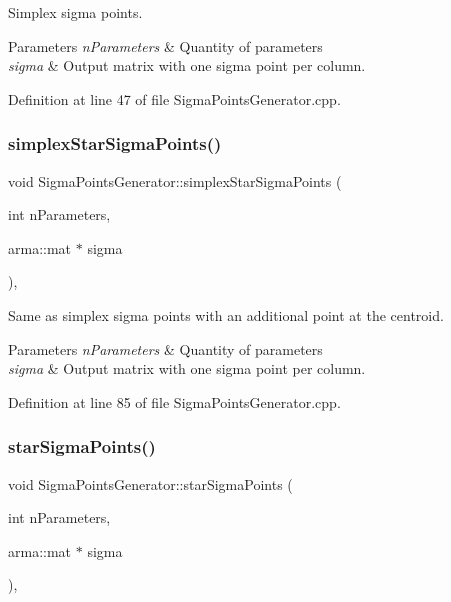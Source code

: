 Simplex sigma points. 
\begin{DoxyParams}{Parameters}
{\em n\+Parameters} & Quantity of parameters \\
\hline
{\em sigma} & Output matrix with one sigma point per column. \\
\hline
\end{DoxyParams}


Definition at line 47 of file Sigma\+Points\+Generator.\+cpp.

\mbox{\label{classSigmaPointsGenerator_aecd82749d0e9865e6abfb9b8410b9542}} 
\subsubsection{\texorpdfstring{simplex\+Star\+Sigma\+Points()}{simplexStarSigmaPoints()}}
{\footnotesize\ttfamily void Sigma\+Points\+Generator\+::simplex\+Star\+Sigma\+Points (\begin{DoxyParamCaption}\item[{int}]{n\+Parameters,  }\item[{arma\+::mat $\ast$}]{sigma }\end{DoxyParamCaption})\hspace{0.3cm}{\ttfamily [static]}, {\ttfamily [protected]}}

Same as simplex sigma points with an additional point at the centroid. 
\begin{DoxyParams}{Parameters}
{\em n\+Parameters} & Quantity of parameters \\
\hline
{\em sigma} & Output matrix with one sigma point per column. \\
\hline
\end{DoxyParams}


Definition at line 85 of file Sigma\+Points\+Generator.\+cpp.

\mbox{\label{classSigmaPointsGenerator_a4187ef53aff978a7f2874533ce2fb0f1}} 
\subsubsection{\texorpdfstring{star\+Sigma\+Points()}{starSigmaPoints()}}
{\footnotesize\ttfamily void Sigma\+Points\+Generator\+::star\+Sigma\+Points (\begin{DoxyParamCaption}\item[{int}]{n\+Parameters,  }\item[{arma\+::mat $\ast$}]{sigma }\end{DoxyParamCaption})\hspace{0.3cm}{\ttfamily [static]}, {\ttfamily [protected]}}

